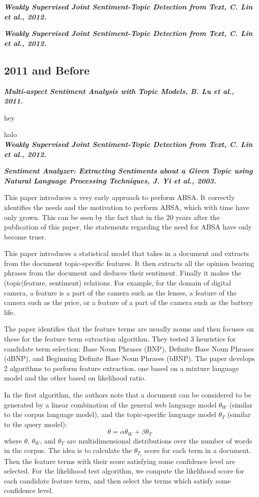 \documentclass[conference]{IEEEtran}
\begin{document}
\textit{\textbf{Weakly Supervised Joint Sentiment-Topic Detection from Text, C. Lin et al., 2012.}}

\textit{\textbf{Weakly Supervised Joint Sentiment-Topic Detection from Text, C. Lin et al., 2012.}}

\subsection{2011 and Before}

\textit{\textbf{Multi-aspect Sentiment Analysis with Topic Models, B. Lu et al., 2011.}}

hey

halo\\

\textit{\textbf{Weakly Supervised Joint Sentiment-Topic Detection from Text, C. Lin et al., 2012.}}

\textit{\textbf{Sentiment Analyzer: Extracting Sentiments about a Given Topic using Natural Language Processing Techniques, J. Yi et al., 2003.}}

This paper introduces a very early approach to perform ABSA. It correctly identifies the needs and the motivation to perform ABSA, which with time have only grown. This can be seen by the fact that in the 20 years after the publication of this paper, the statements regarding the need for ABSA have only become truer.

This paper introduces a statistical model that takes in a document and extracts from the document topic-specific features. It then extracts all the opinion bearing phrases from the document and deduces their sentiment. Finally it makes the (topic$\mid$feature, sentiment) relations. For example, for the domain of digital camera, a feature is a part of the camera such as the lenses, a feature of the camera such as the price, or a feature of a part of the camera such as the battery life.

The paper identifies that the feature terms are usually nouns and then focuses on these for the feature term extraction algorithm. They tested 3 heuristics for candidate term selection: Base Noun Phrases (BNP),  Definite Base Noun Phrases (dBNP), and Beginning Definite Base Noun Phrases (bBNP). The paper develops 2 algorithms to perform feature extraction, one based on a mixture language model and the other based on likelihood ratio.

In the first algorithm, the authors note that a document can be considered to be generated by a linear combination of the general web language model $\theta_W$ (similar to the corpus language model), and the  topic-specific language model $\theta_T$ (similar to the query model):
\begin{equation*}
  \theta = \alpha \theta_W + \beta \theta_T
\end{equation*}
where $\theta$, $\theta_W$, and $\theta_T$ are multidimensional distributions over the number of words in the corpus. The idea is to calculate the $\theta_{T_i}$ score for each term in a document. Then the feature terms with their score satisfying some confidence level are selected. For the likelihood test algorithm, we compute the likelihood score for each candidate feature term, and then select the terms which satisfy some confidence level.
\end{document}
